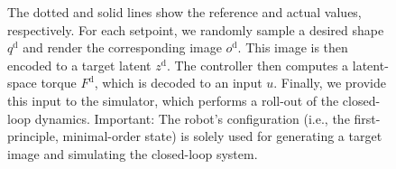 \begin{figure}[ht]
{    The dotted and solid lines show the reference and actual values, respectively.
    For each setpoint, we randomly sample a desired shape $q^\mathrm{d}$ and render the corresponding image $o^\mathrm{d}$. This image is then encoded to a target latent $z^\mathrm{d}$. The controller then computes a latent-space torque $F^\mathrm{d}$, which is decoded to an input $u$. Finally, we provide this input to the simulator, which performs a roll-out of the closed-loop dynamics.
    Important: The robot's configuration (i.e., the first-principle, minimal-order state) is solely used for generating a target image and simulating the closed-loop system. 
    }\label{fig:apx-con:control:pcc_ns-2:con_PsatID+FF_results}
\end{figure}

